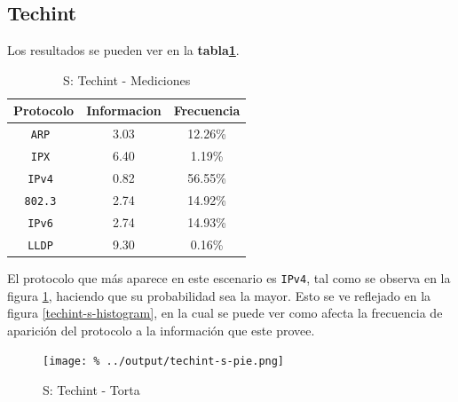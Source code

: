 \documentclass[final,inline,a4paper,narroweqnarray]{ieee}
\begin{document}
    \subsection{Techint}

    Los resultados se pueden ver en la
    \textbf{tabla\ref{techint-s-table}}.

    \begin{table}\begin{center}
      \begin{tabular}{|c|c|c|}
      \hline
      \textbf{Protocolo} & \textbf{Informacion} & \textbf{Frecuencia} \\ \hline
      \texttt{ARP       }& 3.03        & 12.26\%    \\ \hline
      \texttt{IPX       }& 6.40        & 1.19\%     \\ \hline
      \texttt{IPv4      }& 0.82        & 56.55\%    \\ \hline
      \texttt{802.3     }& 2.74        & 14.92\%    \\ \hline
      \texttt{IPv6      }& 2.74        & 14.93\%    \\ \hline
      \texttt{LLDP      }& 9.30        & 0.16\%     \\ \hline
      \end{tabular}
      \caption{S: Techint - Mediciones}
      \label{techint-s-table}
    \end{center}\end{table}

    El protocolo que más aparece en este escenario es \texttt{IPv4},
    tal como se observa en la figura \ref{techint-s-pie}, haciendo que
    su probabilidad sea la mayor. Esto se ve reflejado en la figura
    \ref{techint-s-histogram}, en la cual se puede ver como afecta la
    frecuencia de aparición del protocolo a la información que este
    provee.


    \begin{figure}[ht]\begin{center}
      \texttt{[image: \%
      ../output/techint-s-pie.png]}
      \vspace{-3em}
      \caption{S: Techint - Torta}
      \label{techint-s-pie}
    \end{center}\end{figure}
\end{document}
